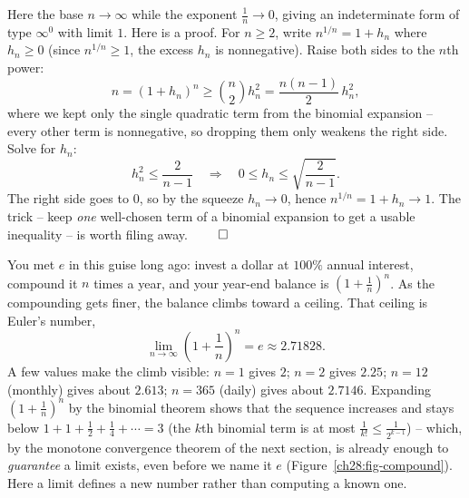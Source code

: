 \begin{example}
\label{ch28:ex-nroot}
Here the base $n \to \infty$ while the exponent $\tfrac1n \to 0$, giving an
indeterminate form of type $\infty^0$ with limit $1$. Here is a proof.
For $n \ge 2$, write $n^{1/n} = 1 + h_n$ where $h_n \ge 0$
(since $n^{1/n} \ge 1$, the excess $h_n$ is nonnegative). Raise both sides to the
$n$th power:
\[
  n = (1 + h_n)^n \ge \binom{n}{2} h_n^2 = \frac{n(n-1)}{2}\,h_n^2,
\]
where we kept only the single quadratic term from the binomial expansion -- every
other term is nonnegative, so dropping them only weakens the right side. Solve for
$h_n$:
\[
  h_n^2 \le \frac{2}{n-1}
  \quad\Longrightarrow\quad
  0 \le h_n \le \sqrt{\frac{2}{n-1}}.
\]
The right side goes to $0$, so by the squeeze $h_n \to 0$, hence $n^{1/n} = 1 +
h_n \to 1$. The trick -- keep \emph{one} well-chosen term of a binomial expansion
to get a usable inequality -- is worth filing away. $\qed$
\end{example}

\begin{example}
\label{ch28:ex-euler}
You met $e$ in this guise long ago: invest a dollar at $100\%$ annual interest,
compound it $n$ times a year, and your year-end balance is $(1 + \tfrac1n)^n$. As
the compounding gets finer, the balance climbs toward a ceiling. That ceiling is
Euler's number,
\[
  \lim_{n\to\infty}\left(1 + \frac1n\right)^{\!n} = e \approx 2.71828.
\]
A few values make the climb visible: $n=1$ gives $2$; $n=2$ gives $2.25$; $n=12$
(monthly) gives about $2.613$; $n=365$ (daily) gives about $2.7146$. Expanding
$(1+\tfrac1n)^n$ by the binomial theorem shows that the sequence increases and stays
below $1 + 1 + \tfrac12 + \tfrac14 + \cdots = 3$ (the $k$th binomial term is at most
$\tfrac{1}{k!} \le \tfrac{1}{2^{k-1}}$) -- which, by the monotone
convergence theorem of the next section, is already enough to \emph{guarantee} a
limit exists, even before we name it $e$ (Figure~\ref{ch28:fig-compound}). Here a limit
defines a new number rather than computing a known one.
\end{example}

